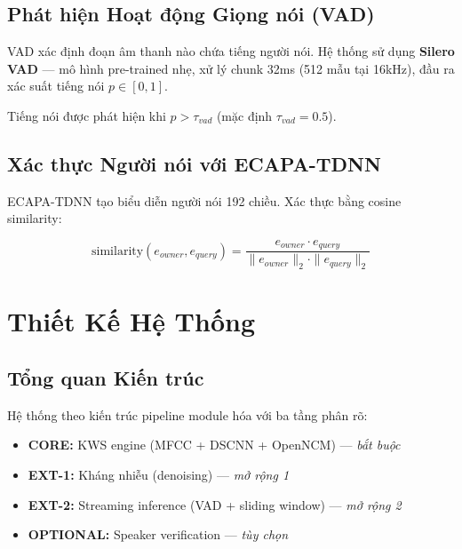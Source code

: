 \documentclass[12pt,a4paper]{report}
\begin{document}
\section{Phát hiện Hoạt động Giọng nói (VAD)}

VAD xác định đoạn âm thanh nào chứa tiếng người nói. Hệ thống sử dụng
\textbf{Silero VAD} --- mô hình pre-trained nhẹ, xử lý chunk 32ms (512 mẫu
tại 16kHz), đầu ra xác suất tiếng nói $p \in [0, 1]$.

Tiếng nói được phát hiện khi $p > \tau_{vad}$ (mặc định $\tau_{vad} = 0.5$).


\section{Xác thực Người nói với ECAPA-TDNN}

ECAPA-TDNN tạo biểu diễn người nói 192 chiều. Xác thực bằng cosine similarity:

\begin{equation}
    \text{similarity}(e_{owner}, e_{query}) =
    \frac{e_{owner} \cdot e_{query}}
         {\|e_{owner}\|_2 \cdot \|e_{query}\|_2}
\end{equation}


\chapter{Thiết Kế Hệ Thống}

\section{Tổng quan Kiến trúc}

Hệ thống theo kiến trúc pipeline module hóa với ba tầng phân rõ:

\begin{itemize}
    \item \textcolor{corecolor}{\textbf{CORE:}} KWS engine (MFCC + DSCNN +
          OpenNCM) --- \textit{bắt buộc}
    \item \textcolor{ext1color}{\textbf{EXT-1:}} Kháng nhiễu (denoising) ---
          \textit{mở rộng 1}
    \item \textcolor{ext2color}{\textbf{EXT-2:}} Streaming inference (VAD +
          sliding window) --- \textit{mở rộng 2}
    \item \textcolor{optcolor}{\textbf{OPTIONAL:}} Speaker verification ---
          \textit{tùy chọn}
\end{itemize}
\end{document}
